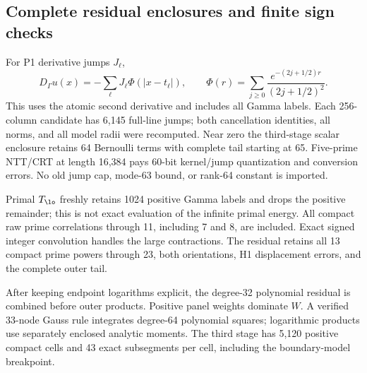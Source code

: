 \documentclass[11pt,a4paper]{article}
\numberwithin{equation}{section}
\theoremstyle{definition}\newtheorem{definition}[theorem]{Definition}
\theoremstyle{remark}\newtheorem{remark}[theorem]{Remark}
\begin{document}
\subsection{Complete residual enclosures and finite sign checks}\label{vrg:sec:numerics}
For P1 derivative jumps \(J_\ell\),
\[
D_\Gamma u(x)=-\sum_\ell J_\ell\Phi(|x-t_\ell|),\qquad
\Phi(r)=\sum_{j\geq0}\frac{e^{-(2j+1/2)r}}{(2j+1/2)^2}.
\]
This uses the atomic second derivative and includes all Gamma labels.
Each 256-column candidate has 6,145 full-line jumps; both cancellation identities,
all norms, and all model radii were recomputed. Near zero the third-stage scalar
enclosure retains 64 Bernoulli terms with complete tail starting at 65.
Five-prime NTT/CRT at length 16,384 pays 60-bit kernel/jump quantization
and conversion errors. No old jump cap, mode-63 bound, or rank-64 constant
is imported.

Primal \(T_{\lo}\) freshly retains 1024 positive Gamma labels and drops the
positive remainder; this is not exact evaluation of the infinite primal
energy. All compact raw prime correlations through 11, including 7 and 8,
are included. Exact signed integer convolution handles the large contractions.
The residual retains all 13 compact prime powers through 23, both
orientations, H1 displacement errors, and the complete outer tail.

After keeping endpoint logarithms explicit, the degree-32 polynomial
residual is combined before outer products. Positive panel weights dominate
\(W\). A verified 33-node Gauss rule integrates degree-64 polynomial
squares; logarithmic products use separately enclosed analytic moments.
The third stage has 5,120 positive compact cells and 43 exact subsegments
per cell, including the boundary-model breakpoint.
\end{document}
